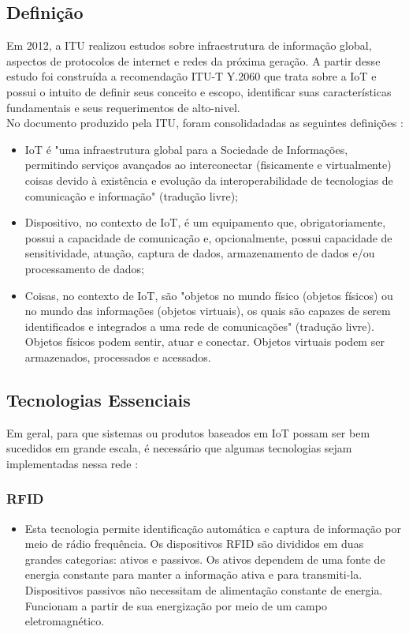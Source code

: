 \subsection{Definição}
	\quad Em 2012, a \acrfull{ITU} realizou estudos sobre infraestrutura
	de informação global, aspectos de protocolos de internet e redes da próxima geração.
	A partir desse estudo foi construída a recomendação ITU-T Y.2060 \cite{ITU} que trata sobre a \acrlong{IoT}
	e possui o intuito de definir seus conceito e escopo, identificar
	suas características fundamentais e seus requerimentos de alto-nivel.
  \\ \null
  \quad	No documento produzido pela \acrshort{ITU}, foram consolidadadas as seguintes definições \cite{ITU}:
	\begin{itemize}
		\item \acrlong{IoT} é "uma infraestrutura global para a Sociedade de Informações, permitindo serviços avançados ao
		interconectar (fisicamente e virtualmente) coisas devido à existência e evolução da interoperabilidade
	de tecnologias de comunicação e informação" (tradução livre);%
		\item Dispositivo, no contexto de \acrshort{IoT}, é um equipamento que, obrigatoriamente, possui a capacidade
		de comunicação e, opcionalmente, possui capacidade de sensitividade, atuação, captura de dados,
		armazenamento de dados e/ou processamento de dados;
		\item Coisas, no contexto de \acrshort{IoT}, são "objetos
	no mundo físico (objetos físicos) ou no mundo das informações (objetos virtuais), os quais são capazes
	de serem identificados e integrados a uma rede de comunicações" (tradução livre). Objetos físicos podem sentir, atuar e conectar.
	Objetos virtuais podem ser armazenados, processados e acessados.
	\end{itemize}
\subsection{Tecnologias Essenciais}
\quad Em geral, para que sistemas ou produtos baseados em \acrlong{IoT} possam ser bem sucedidos em grande escala, é necessário que algumas tecnologias sejam implementadas nessa rede \cite{IOTA}:
	\subsubsection{\acrfull{RFID}}
		\begin{itemize}
			\item Esta tecnologia permite identificação automática e captura de informação por meio de rádio frequência.
			Os dispositivos \acrshort{RFID} são divididos em duas grandes categorias: ativos e passivos. Os ativos dependem
			de uma fonte de energia constante para manter a informação ativa e para transmiti-la. Dispositivos passivos não necessitam de alimentação constante de energia.
			Funcionam a partir de sua energização por meio de um campo eletromagnético.
			\cite{refrfid}
		\end{itemize}
